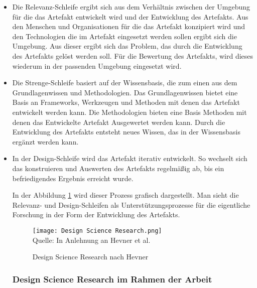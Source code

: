 \begin{itemize}
    \item Die Relevanz-Schleife ergibt sich aus dem Verhältnis zwischen der Umgebung für die das Artefakt entwickelt wird und der Entwicklung des Artefakts. Aus den Menschen und Organisationen für die das Artefakt konzipiert wird und den Technologien die im Artefakt eingesetzt werden sollen ergibt sich die Umgebung. Aus dieser ergibt sich das Problem, das durch die Entwicklung des Artefakts gelöst werden soll. Für die Bewertung des Artefakts, wird dieses wiederum in der passenden Umgebung eingesetzt wird.
    \item Die Strenge-Schleife basiert auf der Wissensbasis, die zum einen aus dem Grundlagenwissen und Methodologien. Das Grundlagenwissen bietet eine Basis an Frameworks, Werkzeugen und Methoden mit denen das Artefakt entwickelt werden kann. Die Methodologien bieten eine Basis Methoden mit denen das Entwickelte Artefakt Ausgewertet werden kann. Durch die Entwicklung des Artefakts entsteht neues Wissen, das in der Wissensbasis ergänzt werden kann.
    \item In der Design-Schleife wird das Artefakt iterativ entwickelt. So wechselt sich das konstruieren und Auswerten des Artefakts regelmäßig ab, bis ein befriedigendes Ergebnis erreicht wurde.

In der Abbildung \ref{fig:DesignScienceResearch} wird dieser Prozess grafisch dargestellt. Man sieht die Relevanz- und Design-Schleifen als Unterstützungsprozesse für die eigentliche Forschung in der Form der Entwicklung des Artefakts.

\begin{figure}[H]
    \caption{Design Science Research nach Hevner}\label{fig:DesignScienceResearch}
    \texttt{[image: Design Science Research.png]}
    \\
    Quelle: In Anlehnung an Hevner et al. \cite[S.~80]{Hevner2004}
\end{figure}

\subsubsection{Design Science Research im Rahmen der Arbeit}


\end{itemize}
